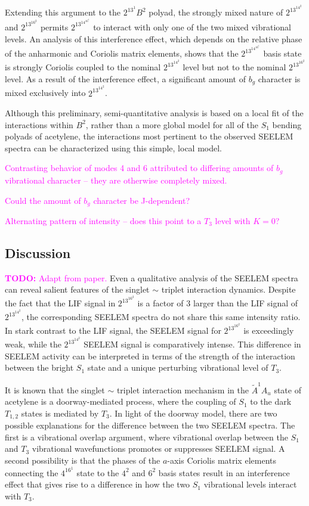 \documentclass[12pt,draft]{mitthesis}
\newcommand{\TODO} [1]{\textcolor{magenta}{\textbf{TODO:} #1}}
\newcommand{\POINT}[1]{\textcolor{magenta}{#1}}
\begin{document}
Extending this argument to the $2^13^1B^2$ polyad, the strongly mixed
nature of $2^13^14^2$ and $2^13^16^2$ permits $2^13^14^16^1$ to
interact with only one of the two mixed vibrational levels. An
analysis of this interference effect, which depends on the relative
phase of the anharmonic and Coriolis matrix elements, shows that the
 $2^13^14^16^1$ basis state is strongly Coriolis coupled to the nominal
$2^13^14^2$ level but not to the nominal $2^13^16^2$ level. As a result
of the interference effect, a significant amount of $b_g$ character is
mixed exclusively into $2^13^14^2$.

Although this preliminary, semi-quantitative analysis is based on a
local fit of the interactions within $B^2$, rather than a more global
model for all of the $S_1$ bending polyads of acetylene, the interactions
most pertinent to the observed SEELEM spectra can be characterized
using this simple, local model.

\POINT{Contrasting behavior of modes 4 and 6 attributed to differing
  amounts of $b_g$ vibrational character -- they are otherwise
  completely mixed.}

\POINT{Could the amount of $b_g$ character be J-dependent?}

\POINT{Alternating pattern of intensity -- does this point to a $T_3$
  level with $K=0$?}

\subsection{Discussion}

\TODO{Adapt from paper.}  Even a qualitative analysis of the SEELEM
spectra can reveal salient features of the singlet $\sim$ triplet
interaction dynamics. Despite the fact that the LIF signal in
$2^13^16^2$ is a factor of 3 larger than the LIF signal of
$2^13^14^2$, the corresponding SEELEM spectra do not share this same
intensity ratio. In stark contrast to the LIF signal, the SEELEM
signal for $2^13^16^2$ is exceedingly weak, while the $2^13^14^2$
SEELEM signal is comparatively intense. This difference in SEELEM
activity can be interpreted in terms of the strength of the
interaction between the bright $S_1$ state and a unique perturbing
vibrational level of $T_3$.

It is known that the singlet $\sim$ triplet interaction mechanism in
the $\tilde{A}^1A_u$ state of acetylene is a doorway-mediated process,
where the coupling of $S_1$ to the dark $T_{1,2}$ states is mediated
by $T_3$.  In light of the doorway model, there are two possible
explanations for the difference between the two SEELEM spectra. The
first is a vibrational overlap argument, where vibrational overlap
between the $S_1$ and $T_3$ vibrational wavefunctions promotes or
suppresses SEELEM signal. A second possibility is that the phases of
the $a$-axis Coriolis matrix elements connecting the $4^16^1$ state to
the $4^2$ and $6^2$ basis states result in an interference effect that
gives rise to a difference in how the two $S_1$ vibrational levels
interact with $T_3$.
\end{document}
